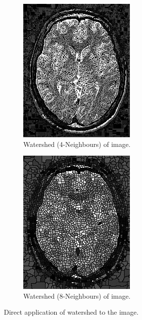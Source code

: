 \documentclass{article}
\begin{document}
\begin{figure}[H] %
\centering
\begin{subfigure}{.5\textwidth}
  \centering
  \includegraphics[scale=0.6]{experiments/brain/4_brain_segmented.jpg}
  \caption{Watershed (4-Neighbours) of image.}
  \label{fig:brain_2}
\end{subfigure}%
\begin{subfigure}{.5\textwidth}
  \centering
  \includegraphics[scale=0.6]{experiments/brain/8_brain_segmented.jpg}
  \caption{Watershed (8-Neighbours) of image.}
  \label{fig:brain_3}
\end{subfigure}
\caption{Direct application of watershed to the image.}
\label{fig:brain}
\end{figure}
\end{document}
